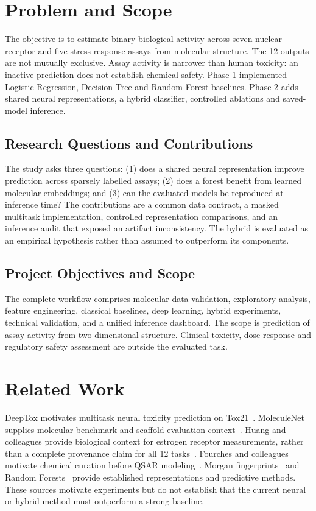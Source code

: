 \documentclass[conference]{IEEEtran}
\begin{document}
\section{Problem and Scope}
The objective is to estimate binary biological activity across seven nuclear receptor and five stress response assays from molecular structure. The 12 outputs are not mutually exclusive. Assay activity is narrower than human toxicity: an inactive prediction does not establish chemical safety. Phase 1 implemented Logistic Regression, Decision Tree and Random Forest baselines. Phase 2 adds shared neural representations, a hybrid classifier, controlled ablations and saved-model inference.

\subsection{Research Questions and Contributions}
The study asks three questions: (1) does a shared neural representation improve prediction across sparsely labelled assays; (2) does a forest benefit from learned molecular embeddings; and (3) can the evaluated models be reproduced at inference time? The contributions are a common data contract, a masked multitask implementation, controlled representation comparisons, and an inference audit that exposed an artifact inconsistency. The hybrid is evaluated as an empirical hypothesis rather than assumed to outperform its components.

\subsection{Project Objectives and Scope}
The complete workflow comprises molecular data validation, exploratory analysis, feature engineering, classical baselines, deep learning, hybrid experiments, technical validation, and a unified inference dashboard. The scope is prediction of assay activity from two-dimensional structure. Clinical toxicity, dose response and regulatory safety assessment are outside the evaluated task.

\section{Related Work}
DeepTox motivates multitask neural toxicity prediction on Tox21~\cite{deeptox}. MoleculeNet supplies molecular benchmark and scaffold-evaluation context~\cite{moleculenet}. Huang and colleagues provide biological context for estrogen receptor measurements, rather than a complete provenance claim for all 12 tasks~\cite{huang}. Fourches and colleagues motivate chemical curation before QSAR modeling~\cite{fourches}. Morgan fingerprints~\cite{morgan} and Random Forests~\cite{breiman} provide established representations and predictive methods. These sources motivate experiments but do not establish that the current neural or hybrid method must outperform a strong baseline.
\end{document}
